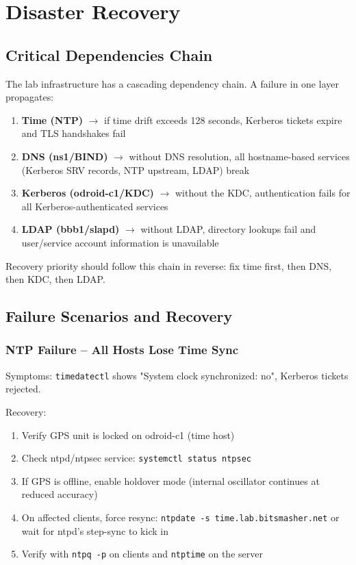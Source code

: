 \section{Disaster Recovery}

\subsection{Critical Dependencies Chain}

The lab infrastructure has a cascading dependency chain. A failure in one layer propagates:

\begin{enumerate}
    \item \textbf{Time (NTP)} $\rightarrow$ if time drift exceeds 128 seconds, Kerberos tickets expire and TLS handshakes fail
    
    \item \textbf{DNS (ns1/BIND)} $\rightarrow$ without DNS resolution, all hostname-based services (Kerberos SRV records, NTP upstream, LDAP) break
    
    \item \textbf{Kerberos (odroid-c1/KDC)} $\rightarrow$ without the KDC, authentication fails for all Kerberos-authenticated services
    
    \item \textbf{LDAP (bbb1/slapd)} $\rightarrow$ without LDAP, directory lookups fail and user/service account information is unavailable
\end{enumerate}

Recovery priority should follow this chain in reverse: fix time first, then DNS, then KDC, then LDAP.

\subsection{Failure Scenarios and Recovery}

\subsubsection{NTP Failure -- All Hosts Lose Time Sync}

Symptoms: \texttt{timedatectl} shows "System clock synchronized: no", Kerberos tickets rejected.

Recovery:
\begin{enumerate}
    \item Verify GPS unit is locked on odroid-c1 (time host)
    
    \item Check ntpd/ntpsec service: \texttt{systemctl status ntpsec}
    
    \item If GPS is offline, enable holdover mode (internal oscillator continues at reduced accuracy)
    
    \item On affected clients, force resync: \texttt{ntpdate -s time.lab.bitsmasher.net} or wait for ntpd's step-sync to kick in
    
    \item Verify with \texttt{ntpq -p} on clients and \texttt{ntptime} on the server
\end{enumerate}

